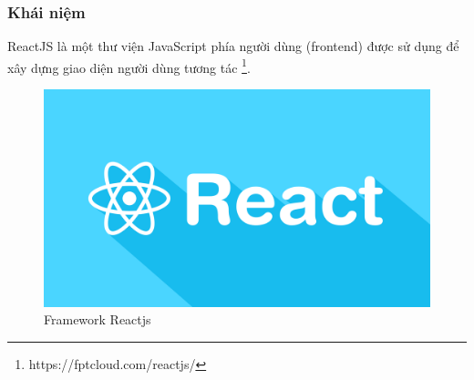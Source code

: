 \subsubsection{Khái niệm}
\noindent ReactJS là một thư viện JavaScript phía người dùng (frontend) được sử dụng để xây dựng giao diện người dùng tương tác \footnote{https://fptcloud.com/reactjs/}.
\begin{figure}[H]
  \begin{center}
    \includegraphics[scale=0.1]{images/hieu/phuluc/react-js.png}
    \caption{Framework Reactjs}
  \end{center}
\end{figure}
